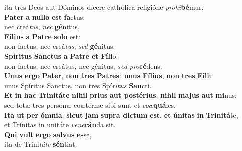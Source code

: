 \oddverse ita tres Deos aut Dóminos dícere cathólica religióne \textit{pro}\textit{hi}\textbf{bé}mur.\\
\evenverse \textbf{Pa}\textbf{ter} \textbf{a} \textbf{nul}\textbf{lo} \textbf{est} \textbf{fa}ctus:~\*\\
\evenverse nec creá\textit{tus}, \textit{nec} \textbf{gé}nitus.\\
\oddverse \textbf{Fí}\textbf{li}\textbf{us} \textbf{a} \textbf{Pa}\textbf{tre} \textbf{so}\textbf{lo} est:~\*\\
\oddverse non factus, nec creá\textit{tus}, \textit{sed} \textbf{gé}nitus.\\
\evenverse \textbf{Spí}\textbf{ri}\textbf{tus} \textbf{San}\textbf{ctus} \textbf{a} \textbf{Pa}\textbf{tre} \textbf{et} \textbf{Fí}\textbf{li}o:~\*\\
\evenverse non factus, nec creátus, nec génitus, \textit{sed} \textit{pro}\textbf{cé}dens.\\
\oddverse \textbf{U}\textbf{nus} \textbf{er}\textbf{go} \textbf{Pa}\textbf{ter}, \textbf{non} \textbf{tres} \textbf{Pa}\textbf{tres}: \textbf{u}\textbf{nus} \textbf{Fí}\textbf{li}\textbf{us}, \textbf{non} \textbf{tres} \textbf{Fí}\textbf{li}i:~\*\\
\oddverse unus Spíritus Sanctus, non tres Spí\textit{ri}\textit{tus} \textbf{San}cti.\\
\evenverse \textbf{Et} \textbf{in} \textbf{hac} \textbf{Tri}\textbf{ni}\textbf{tá}\textbf{te} \textbf{ni}\textbf{hil} \textbf{pri}\textbf{us} \textbf{aut} \textbf{po}\textbf{sté}\textbf{ri}\textbf{us}, \textbf{ni}\textbf{hil} \textbf{ma}\textbf{jus} \textbf{aut} \textbf{mi}nus:~\*\\
\evenverse sed totæ tres persónæ coætérnæ sibi sunt et \textit{co}\textit{æ}\textbf{quá}les.\\
\oddverse \textbf{I}\textbf{ta} \textbf{ut} \textbf{per} \textbf{óm}\textbf{ni}\textbf{a}, \textbf{si}\textbf{cut} \textbf{jam} \textbf{su}\textbf{pra} \textbf{di}\textbf{ctum} \textbf{est}, \textbf{et} \textbf{ú}\textbf{ni}\textbf{tas} \textbf{in} \textbf{Tri}\textbf{ni}\textbf{tá}te,~\*\\
\oddverse et Trínitas in unitáte \textit{ve}\textit{ne}\textbf{rán}da sit.\\
\evenverse \textbf{Qui} \textbf{vult} \textbf{er}\textbf{go} \textbf{sal}\textbf{vus} \textbf{es}se,~\*\\
\evenverse ita de Trini\textit{tá}\textit{te} \textbf{sén}tiat.\\

